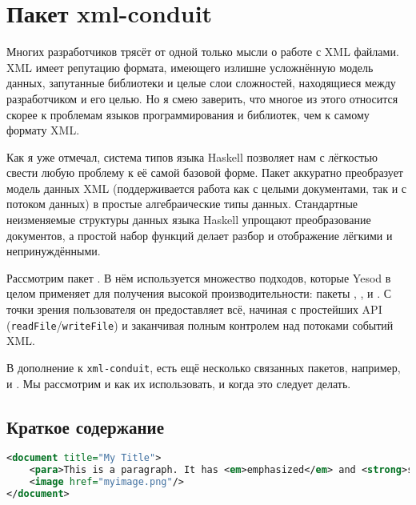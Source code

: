 \chapter{Пакет xml-conduit}

Многих разработчиков трясёт от одной только мысли о работе с XML файлами. XML
имеет репутацию формата, имеющего излишне усложнённую модель данных, запутанные
библиотеки и целые слои сложностей, находящиеся между разработчиком и его
целью. Но я смею заверить, что многое из этого относится скорее к проблемам
языков программирования и библиотек, чем к самому формату XML.

Как я уже отмечал, система типов языка Haskell позволяет нам с лёгкостью свести
любую проблему к её самой базовой форме. Пакет
аккуратно преобразует модель данных XML (поддерживается работа как с целыми
документами, так и с потоком данных) в простые алгебраические типы данных.
Стандартные неизменяемые структуры данных языка Haskell упрощают преобразование
документов, а простой набор функций делает разбор и отображение лёгкими и
непринуждёнными.

Рассмотрим пакет
. В
нём используется множество подходов, которые Yesod в целом применяет для
получения высокой производительности: пакеты
,
,
 и
. С
точки зрения пользователя он предоставляет всё, начиная с простейших API
(\lstinline!readFile!/\lstinline!writeFile!) и заканчивая полным контролем над
потоками событий XML.

В дополнение к \lstinline!xml-conduit!, есть ещё несколько связанных пакетов,
например,
 и
. Мы
рассмотрим и как их использовать, и когда это следует делать.

\section{Краткое содержание} %
\begin{lstlisting}[language=XML, caption={Входной XML файл}]
<document title="My Title">
    <para>This is a paragraph. It has <em>emphasized</em> and <strong>strong</strong> words.</para>
    <image href="myimage.png"/>
</document>
\end{lstlisting}

